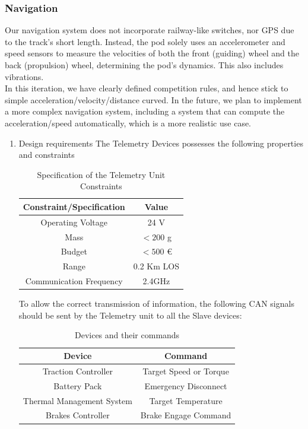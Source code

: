 \subsubsection*{Navigation}
Our navigation system does not incorporate railway-like switches, nor GPS due to the track's short length. Instead, the pod solely uses an accelerometer and speed sensors to measure the velocities of both the front (guiding) wheel and the back (propulsion) wheel,
determining the pod's dynamics. This also includes vibrations.\\
In this iteration, we have clearly defined competition rules, and hence stick to simple acceleration/velocity/distance curved. In the future, we plan to implement a more complex navigation system, including a system that can compute the acceleration/speed automatically, which is a more realistic use case.
\begin{enumerate}
    \item Design requirements
The Telemetry Devices possesses the following properties and constraints

\begin{table}[H]
    \centering
    \begin{adjustbox}{width=0.5\textwidth,center}
    \begin{tabular}{|c|c|}
    \hline
        \textbf{Constraint/Specification} & \textbf{Value} \\ \hline
        Operating Voltage & 24 V \\ \hline
        Mass & $<200$ g \\ \hline
        Budget & $<500$ € \\ \hline
        Range & 0.2 Km LOS \\ \hline
        Communication Frequency & 2.4GHz \\ \hline
    \end{tabular}
    \end{adjustbox}
     \caption{Specification of the Telemetry Unit Constraints}
\label{tab:Telemetry Constraints}
\end{table}

To allow the correct transmission of information, the following CAN signals should be sent by the Telemetry unit to all the Slave devices:
\begin{table}[H]
    \centering
    \begin{adjustbox}{max width=0.5\textwidth,center}
    \begin{tabular}{|c|c|}
        \hline
        \textbf{Device} & \textbf{Command} \\ 
        \hline
        Traction Controller & Target Speed or Torque \\ 
        \hline
        Battery Pack & Emergency Disconnect \\ 
        \hline
        Thermal Management System & Target Temperature \\ 
        \hline
        Brakes Controller & Brake Engage Command \\ 
        \hline
    \end{tabular}
    \end{adjustbox}
 \caption{Devices and their commands}
\label{tab:Command devices.}
\end{table}


\end{enumerate}
